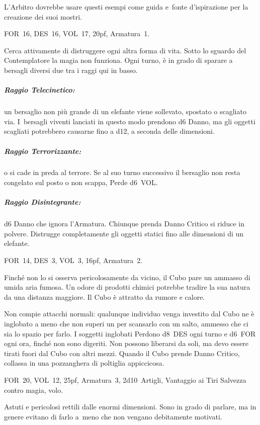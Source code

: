 \documentclass[itdr]{subfiles}
\begin{document}
\label{ch:appendice_b}

L'Arbitro dovrebbe usare questi esempi come guida e~fonte d'ispirazione per la creazione dei suoi mostri.

\vfill

FOR~16, DES~16, VOL~17, 20pf, Armatura~1.

Cerca attivamente di distruggere ogni altra forma di vita. Sotto lo sguardo del Contemplatore la magia non funziona. Ogni turno, è in grado di sparare a bersagli diversi due tra i raggi qui in basso.

\subparagraph{Raggio Telecinetico:} un bersaglio non più grande di un elefante viene sollevato, spostato o scagliato via. I~bersagli viventi lanciati in questo modo prendono d6 Danno, ma gli oggetti scagliati potrebbero causarne fino a d12, a seconda delle dimensioni.

\subparagraph{Raggio Terrorizzante:}  o si cade in preda al terrore. Se al suo turno successivo il bersaglio non resta congelato sul posto o non scappa, Perde d6~VOL.

\subparagraph{Raggio Disintegrante:} d6 Danno che ignora l'\mbox{Armatura}. Chiunque prenda Danno Critico si riduce in polvere. Distrugge completamente gli oggetti statici fino alle dimensioni di un elefante.

\vfill

FOR~14, DES~3, VOL~3, 16pf, Armatura~2.

Finché non lo si osserva pericolosamente da vicino, il Cubo pare un ammasso di umida aria fumosa. Un odore di prodotti chimici potrebbe tradire la sua natura da una distanza maggiore. Il Cubo è attratto da rumore e calore.

Non compie attacchi normali: qualunque individuo venga investito dal Cubo ne è inglobato a meno che non superi un  per scansarlo con un salto, ammesso che ci sia lo spazio per farlo. I soggetti inglobati Perdono d8~DES ogni turno e d6~FOR ogni ora, finché non sono digeriti. Non possono liberarsi da soli, ma devo essere tirati fuori dal Cubo con altri mezzi. Quando il Cubo prende Danno Critico, collassa in una pozzanghera di poltiglia appiccicosa.

\vfill

FOR~20, VOL~12, 25pf, Armatura~3, 2d10~Artigli, \mbox{Vantaggio} ai Tiri Salvezza contro magia, volo.

Astuti e pericolosi rettili dalle enormi dimensioni. Sono in grado di parlare, ma in genere evitano di farlo a~meno che non vengano debitamente motivati.
\end{document}
